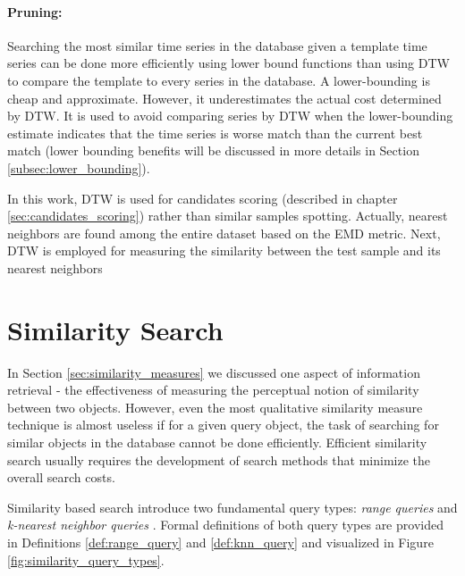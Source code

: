 \paragraph{Pruning:} Searching the most similar time series in the database given a template time series can be done more efficiently using lower bound functions than using DTW to compare the template to every series in the database. A lower-bounding is cheap and approximate. However, it underestimates the actual cost determined by DTW. It is used to avoid comparing series by DTW when the lower-bounding estimate indicates that the time series is worse match than the current best match \cite{rath2003word} (lower bounding benefits will be discussed in more details in Section \ref{subsec:lower_bounding}).

\iftoggle{edit-mode}{\hspace{0pt}\marginpar{How DTW is used in this work?}}{}
In this work, DTW is used for candidates scoring (described in chapter \ref{sec:candidates_scoring}) rather than similar samples spotting. Actually, nearest neighbors are found among the entire dataset based on the EMD metric. Next, DTW is employed for measuring the similarity between the test sample and its nearest neighbors


\newpage{}

\section{Similarity Search}
\label{sec:similarity_search}
 
\iftoggle{edit-mode}{\hspace{0pt}\marginpar{Introduction}}{}
In Section \ref{sec:similarity_measures} we discussed one aspect of information retrieval - the effectiveness of measuring the perceptual notion of similarity between two objects. However, even the most qualitative similarity measure technique is almost useless if for a given query object, the task of searching for similar objects in the database cannot be done efficiently. Efficient similarity search usually requires the development of search methods that minimize the overall search costs.

\iftoggle{edit-mode}{\hspace{0pt}\marginpar{Similarity search query types}}{}
Similarity based search introduce two fundamental query types: \emph{range queries} and \emph{k-nearest neighbor queries} \cite{hetland2009basic}. Formal definitions of both query types are provided in Definitions \ref{def:range_query} and \ref{def:knn_query} and visualized in Figure \ref{fig:similarity_query_types}.

